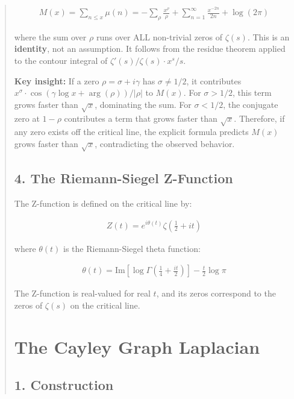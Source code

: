 \documentclass[11pt,letterpaper]{article}
\begin{document}
\begin{abstract}
\begin{align}
M(x) = \sum_{n \leq x} \mu(n) = -\sum_\rho \frac{x^\rho}{\rho} + \sum_{n=1}^{\infty} \frac{x^{-2n}}{2n} + \log(2\pi)
\end{align}


where the sum over $\rho$ runs over ALL non-trivial zeros of $\zeta(s)$. This is an \textbf{identity}, not an assumption. It follows from the residue theorem applied to the contour integral of $\zeta'(s)/\zeta(s) \cdot x^s/s$.

\textbf{Key insight:} If a zero $\rho = \sigma + i\gamma$ has $\sigma \neq 1/2$, it contributes $x^\sigma \cdot \cos(\gamma \log x + \arg(\rho))/|\rho|$ to $M(x)$. For $\sigma > 1/2$, this term grows faster than $\sqrt{x}$, dominating the sum. For $\sigma < 1/2$, the conjugate zero at $1-\rho$ contributes a term that grows faster than $\sqrt{x}$. Therefore, if any zero exists off the critical line, the explicit formula predicts $M(x)$ grows faster than $\sqrt{x}$, contradicting the observed behavior.

\subsection{4. The Riemann-Siegel Z-Function}


The Z-function is defined on the critical line by:

\begin{align}
Z(t) = e^{i\theta(t)} \zeta\left(\frac{1}{2} + it\right)
\end{align}


where $\theta(t)$ is the Riemann-Siegel theta function:

\begin{align}
\theta(t) = \text{Im}\left[\log\Gamma\left(\frac{1}{4} + \frac{it}{2}\right)\right] - \frac{t}{2}\log\pi
\end{align}


The Z-function is real-valued for real $t$, and its zeros correspond to the zeros of $\zeta(s)$ on the critical line.


\section{The Cayley Graph Laplacian}


\subsection{1. Construction}



\end{abstract}
\end{document}

